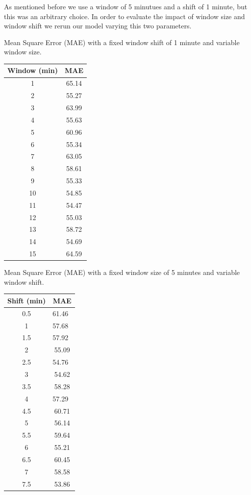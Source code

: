 As mentioned before we use a window of 5 minutues and a shift of 1 minute, but this was an arbitrary choice. In order to evaluate the impact of window size and window shift we rerun our model varying this two parameters.

Mean Square Error (MAE) with a fixed window shift of 1 minute and variable window size. 

\begin{center}
\begin{tabular}{| c | c |} 
\hline
Window (min) & MAE  \\ [0.5ex] 
\hline
\hline
 1 & 65.14 \\
 \hline
 2 & 55.27 \\
 \hline
 3 & 63.99 \\
 \hline
 4 & 55.63 \\
 \hline
 5 & 60.96 \\
 \hline
 6 & 55.34 \\
 \hline
 7 & 63.05 \\
 \hline
 8 & 58.61 \\
 \hline
 9 & 55.33 \\
 \hline
 10 & 54.85 \\
 \hline
 11 & 54.47 \\
 \hline
 12 & 55.03 \\
 \hline
 13 & 58.72 \\
 \hline
 14 & 54.69 \\
 \hline
 15 & 64.59 \\
\hline
\end{tabular}
\end{center}

Mean Square Error (MAE) with a fixed window size of 5 minutes and variable window shift. 

\begin{center}
\begin{tabular}{| c | c |} 
\hline
Shift (min) & MAE  \\ [0.5ex] 
\hline
\hline
0.5 & 61.46\ \\
\hline
1 & 57.68\ \\
\hline 
1.5 & 57.92\ \\
\hline 
2 & 55.09 \\
\hline 
2.5 & 54.76\ \\
\hline 
3 & 54.62 \\
\hline 
3.5 & 58.28 \\
\hline 
4 & 57.29\ \\
\hline 
4.5 & 60.71 \\
\hline 
5 & 56.14 \\
\hline
5.5 & 59.64 \\
\hline 
6 & 55.21 \\
\hline
6.5 & 60.45 \\
\hline
7 & 58.58 \\
\hline 
7.5 & 53.86 \\
\hline
\end{tabular}
\end{center}

